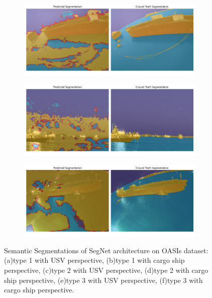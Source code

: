 \begin{figure}[ht!]
\begin{subfigure}[h]{0.49\textwidth}
        \caption{}
    \end{subfigure} \hspace{-10mm}
    \begin{subfigure}[h]{0.49\textwidth} \centering
        \includegraphics[width=0.99\textwidth]{figures/OASIs/SegNet-type2-24.png}
        \caption{}
    \end{subfigure}
    \begin{subfigure}[h]{0.49\textwidth} \centering
        \includegraphics[width=0.99\textwidth]{figures/OASIs/SegNet-type3-53.png}
        \caption{}
    \end{subfigure} \hspace{-10mm}
    \begin{subfigure}[h]{0.49\textwidth} \centering
        \includegraphics[width=0.99\textwidth]{figures/OASIs/SegNet-type3-18.png}
        \caption{}
    \end{subfigure}
    \caption{Semantic Segmentations of SegNet architecture on OASIs dataset: (a)type 1 with USV perspective, 
    (b)type 1 with cargo ship perspective, (c)type 2 with USV perspective, (d)type 2 with cargo ship perspective, 
    (e)type 3 with USV perspective, (f)type 3 with cargo ship perspective.}
    \label{fig:segnet-oasis}
\end{figure}

